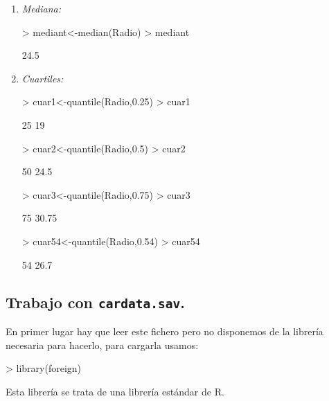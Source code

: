 \documentclass [a4paper] {article}
\begin{document}
\begin{enumerate}
\item
\textit{Mediana:}
\begin{Schunk}
\begin{Sinput}
> mediant<-median(Radio)
> mediant
\end{Sinput}
\begin{Soutput}
[1] 24.5
\end{Soutput}
\end{Schunk}

\item
\textit{Cuartiles:}
\begin{Schunk}
\begin{Sinput}
> cuar1<-quantile(Radio,0.25)
> cuar1
\end{Sinput}
\begin{Soutput}
25%
 19 
\end{Soutput}
\begin{Sinput}
> cuar2<-quantile(Radio,0.5)
> cuar2
\end{Sinput}
\begin{Soutput}
 50%
24.5 
\end{Soutput}
\begin{Sinput}
> cuar3<-quantile(Radio,0.75)
> cuar3
\end{Sinput}
\begin{Soutput}
  75%
30.75 
\end{Soutput}
\begin{Sinput}
> cuar54<-quantile(Radio,0.54)
> cuar54
\end{Sinput}
\begin{Soutput}
 54%
26.7 
\end{Soutput}
\end{Schunk}
\end{enumerate}

\bigskip
\subsection{Trabajo con \texttt{cardata.sav}.}

\bigskip
En primer lugar hay que leer este fichero pero no disponemos de la librer\'ia
necesaria para hacerlo, para cargarla usamos:
\begin{Schunk}
\begin{Sinput}
> library(foreign)
\end{Sinput}
\end{Schunk}
Esta librer\'ia se trata de una librer\'ia est\'andar de R.
\end{document}
